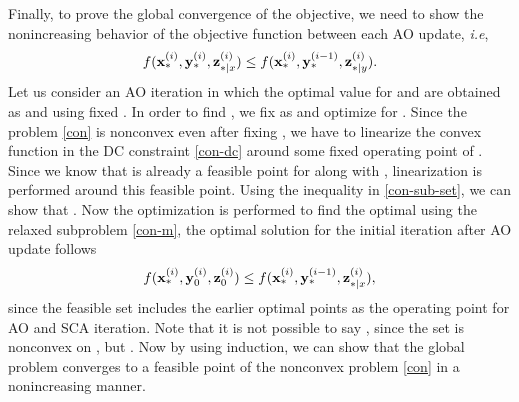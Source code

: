 Finally, to prove the global convergence of the objective, we need to show the nonincreasing behavior of the objective function between each \ac{AO} update, \textit{i.e}, 
\begin{equation*}
f({\mathbf{x}}_{\ast}^{(i)},{\mathbf{y}}_{\ast}^{(i)},{\mathbf{z}}_{\ast|x}^{(i)}) \leq f({\mathbf{x}}_{\ast}^{(i)},{\mathbf{y}}_{\ast}^{(i-1)},{\mathbf{z}}_{\ast|y}^{(i)}).
\end{equation*}
Let us consider an \ac{AO} iteration  in which the optimal value for \eqn{\mx} and \eqn{\mz} are obtained as  and  using fixed . In order to find , we fix \eqn{\mx} as  and optimize for \me{\my}. Since the problem \eqref{con} is nonconvex even after fixing \me{\mx}, we have to linearize the convex function in the \ac{DC} constraint \eqref{con-dc} around some fixed operating point of \me{\my}. Since we know that  is already a feasible point for \me{\my} along with , linearization is performed around this feasible point. Using the inequality in \eqref{con-sub-set}, we can show that . Now the optimization is performed to find the optimal \me{\my} using the relaxed subproblem \eqref{con-m}, the optimal solution  for the initial iteration after \ac{AO} update follows
\begin{equation*}
f({\mathbf{x}}_{\ast}^{(i)},{\mathbf{y}}_{0}^{(i)},{\mathbf{z}}_{0}^{(i)}) \leq f({\mathbf{x}}_{\ast}^{(i)},{\mathbf{y}}_{\ast}^{(i-1)},{\mathbf{z}}_{\ast|x}^{(i)}),
\end{equation*}
since the feasible set includes the earlier optimal points  as the operating point for \ac{AO} and \ac{SCA} iteration. Note that it is not possible to say , since the set is nonconvex on \me{\mx,\my}, but . Now by using induction, we can show that the global problem converges to a feasible point of the nonconvex problem \eqref{con} in a nonincreasing manner.

